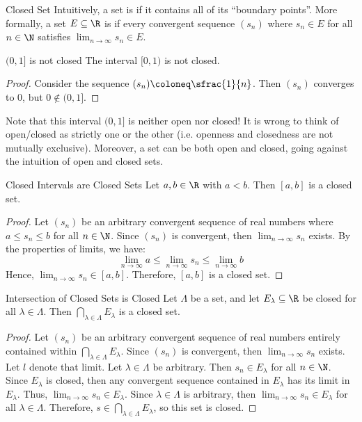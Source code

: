 \begin{dfnbox}{Closed Set}{}
    Intuitively, a set is  if it contains all of its ``boundary points''.
    \tcblower
    More formally, a set $E \subseteq \R$ is  if every convergent sequence $(s_n)$ where $s_n \in E$ for all $n \in \N$ satisfies $\lim_{n \to \infty} s_n \in E$.
\end{dfnbox}

\begin{exbox}{$(0,1]$ is not closed}{}
    The interval $[0,1)$ is not closed.
    \tcblower
    \begin{proof}
        Consider the sequence $(s_n) \coloneq \sfrac{1}{n}$. Then $(s_n)$ converges to $0$, but $0 \notin (0,1]$.
    \end{proof}
\end{exbox}

Note that this interval $(0, 1]$ is neither open nor closed! It is wrong to think of open/closed as strictly one or the other (i.e. openness and closedness are not mutually exclusive). Moreover, a set can be both open and closed, going against the intuition of open and closed sets.


\begin{lembox}{Closed Intervals are Closed Sets}{}
    Let $a,b \in \R$ with $a<b$. Then $[a,b]$ is a closed set.
    \tcblower
    \begin{proof}
        Let $(s_n)$ be an arbitrary convergent sequence of real numbers where $a \leq s_n \leq b$ for all $n \in \N$. Since $(s_n)$ is convergent, then $\lim_{n \to \infty} s_n$ exists. By the properties of limits, we have:
        \[ \lim_{n\to\infty} a \leq \lim_{n\to\infty} s_n \leq \lim_{n\to\infty} b \]
        Hence, $\lim_{n\to\infty} s_n \in [a,b]$. Therefore, $[a,b]$ is a closed set.
    \end{proof}
\end{lembox}

\begin{thmbox}{Intersection of Closed Sets is Closed}{}
    Let $\Lambda$ be a set, and let $E_\lambda \subseteq \R$ be closed for all $\lambda \in \Lambda$. Then $\bigcap_{\lambda \in \Lambda} E_\lambda$ is a closed set.
    \tcblower
    \begin{proof}
        Let $(s_n)$ be an arbitrary convergent sequence of real numbers entirely contained within $\bigcap_{\lambda \in \Lambda} E_\lambda$. Since $(s_n)$ is convergent, then $\lim_{n \to \infty} s_n$ exists. Let $l$ denote that limit. Let $\lambda \in \Lambda$ be arbitrary. Then $s_n \in E_\lambda$ for all $n \in \N$. Since $E_\lambda$ is closed, then any convergent sequence contained in $E_\lambda$ has its limit in $E_\lambda$. Thus, $\lim_{n \to \infty} s_n \in E_\lambda$. Since $\lambda \in \Lambda$ is arbitrary, then $\lim_{n \to \infty} s_n \in E_\lambda$ for all $\lambda \in \Lambda$. Therefore, $s \in \bigcap_{\lambda \in \Lambda} E_\lambda$, so this set is closed.
    \end{proof}
\end{thmbox}

